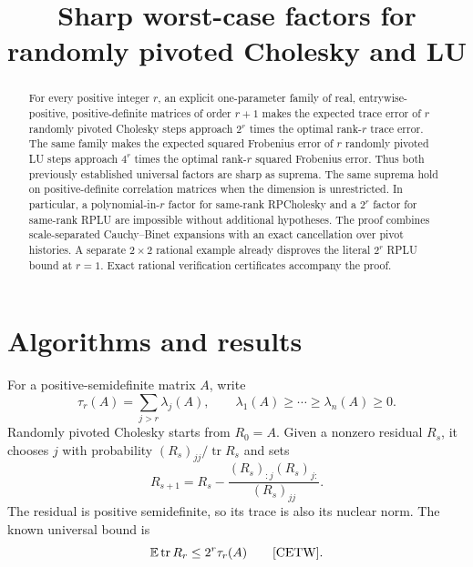 \documentclass[11pt]{article}
\title{Sharp worst-case factors for randomly pivoted Cholesky and LU}
\author{}
\date{}
\theoremstyle{remark}
\DeclareMathOperator{\tr}{tr}
\newcommand{\E}{\mathbb E}
\begin{document}
\maketitle
\vspace{-2.2em}
\begin{abstract}
For every positive integer $r$, an explicit one-parameter family of real,
entrywise-positive, positive-definite matrices of order $r+1$ makes the expected
trace error of $r$ randomly pivoted Cholesky steps approach $2^r$ times the optimal
rank-$r$ trace error. The same family makes the expected squared Frobenius error
of $r$ randomly pivoted LU steps approach $4^r$ times the optimal rank-$r$
squared Frobenius error. Thus both previously established universal factors are
sharp as suprema. The same suprema hold on positive-definite correlation
matrices when the dimension is unrestricted. In particular, a polynomial-in-$r$ factor for same-rank
RPCholesky and a $2^r$ factor for same-rank RPLU are impossible without additional
hypotheses. The proof combines scale-separated Cauchy--Binet expansions with an
exact cancellation over pivot histories. A separate $2\times2$ rational example
already disproves the literal $2^r$ RPLU bound at $r=1$. Exact rational
verification certificates accompany the proof.
\end{abstract}

\section{Algorithms and results}

For a positive-semidefinite matrix $A$, write
\[
 \tau_r(A)=\sum_{j>r}\lambda_j(A),
 \qquad \lambda_1(A)\ge\cdots\ge\lambda_n(A)\ge0.
\]
Randomly pivoted Cholesky starts from $R_0=A$. Given a nonzero residual $R_s$,
it chooses $j$ with probability $(R_s)_{jj}/\tr R_s$ and sets
\begin{equation}\label{eq:chol-update}
 R_{s+1}=R_s-\frac{(R_s)_{:j}(R_s)_{j:}}{(R_s)_{jj}}.
\end{equation}
The residual is positive semidefinite, so its trace is also its nuclear norm.
The known universal bound is
\begin{equation}\label{eq:known-chol}
 \E\tr R_r\le 2^r\tau_r(A)
 \qquad\text{\cite[Lemma 5.5]{CETW}}.
\end{equation}
\end{document}
